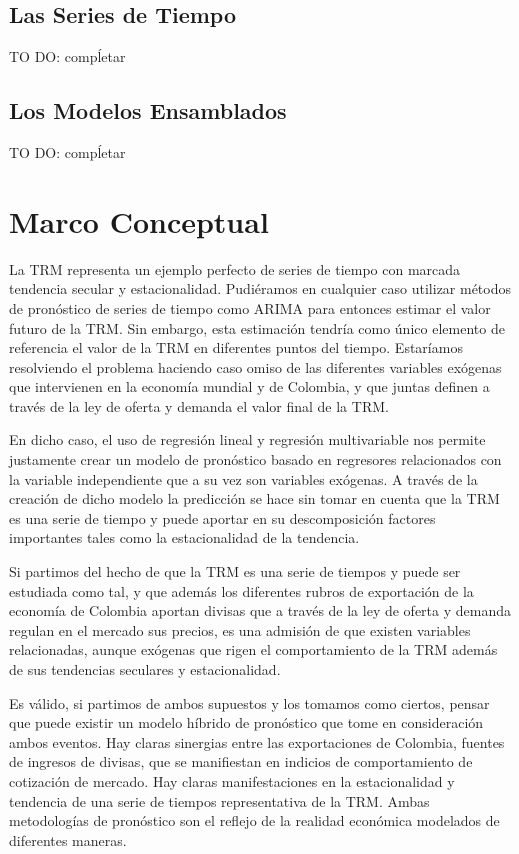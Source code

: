 \subsection{Las Series de Tiempo}
TO DO: compĺetar

\subsection{Los Modelos Ensamblados}
TO DO: compĺetar

\section{Marco Conceptual}
La TRM representa un ejemplo perfecto de series de tiempo con marcada tendencia secular y estacionalidad. Pudiéramos en cualquier caso utilizar métodos de pronóstico de series de tiempo como ARIMA para entonces estimar el valor futuro de la TRM. Sin embargo, esta estimación tendría como único elemento de referencia el valor de la TRM en diferentes puntos del tiempo. Estaríamos resolviendo el problema haciendo caso omiso de las diferentes variables exógenas que intervienen en la economía mundial y de Colombia, y que juntas definen a través de la ley de oferta y demanda el valor final de la TRM.
 
En dicho caso, el uso de regresión lineal y regresión multivariable nos permite justamente crear un modelo de pronóstico basado en regresores relacionados con la variable independiente que a su vez son variables exógenas. A través de la creación de dicho modelo la predicción se hace sin tomar en cuenta que la TRM es una serie de tiempo y puede aportar en su descomposición factores importantes tales como la estacionalidad de la tendencia.
 
Si partimos del hecho de que la TRM es una serie de tiempos y puede ser estudiada como tal, y que además los diferentes rubros de exportación de la economía de Colombia aportan divisas que a través de la ley de oferta y demanda regulan en el mercado sus precios, es una admisión de que existen variables relacionadas, aunque exógenas que rigen el comportamiento de la TRM además de sus tendencias seculares y estacionalidad.
 
Es válido, si partimos de ambos supuestos y los tomamos como ciertos, pensar que puede existir un modelo híbrido de pronóstico que tome en consideración ambos eventos. Hay claras sinergias entre las exportaciones de Colombia, fuentes de ingresos de divisas, que se manifiestan en indicios de comportamiento de cotización de mercado. Hay claras manifestaciones en la estacionalidad y tendencia de una serie de tiempos representativa de la TRM. Ambas metodologías de pronóstico son el reflejo de la realidad económica modelados de diferentes maneras.
 
